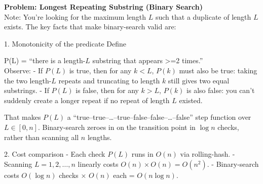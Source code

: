 \noindent\textbf{Problem: Longest Repeating Substring (Binary Search)} 
\\ 

Note: You’re looking for the maximum length \(L\) such that a duplicate of length \(L\) exists. The key facts that make binary-search valid are:

1.  Monotonicity of the predicate  
    Define  

      P(L) = “there is a length-\(L\) substring that appears >=2 times.”
    \\
    Observe:
    -  If \(P(L)\) is true, then for any \(k < L\), \(P(k)\) must also be true: taking the two length-\(L\) repeats and truncating to length \(k\) still gives two equal substrings.
    -  If \(P(L)\) is false, then for any \(k > L\), \(P(k)\) is also false: you can’t suddenly create a longer repeat if no repeat of length \(L\) existed.

    That makes \(P(L)\) a “true–true–…–true–false–false–…–false” step function over \(L\in[0,n]\). Binary-search zeroes in on the transition point in \(\log n\) checks, rather than scanning all \(n\) lengths.

2.  Cost comparison  
    -  Each check \(P(L)\) runs in \(O(n)\) via rolling-hash.  
    -  Scanning \(L=1,2,\dots,n\) linearly costs \(O(n)\times O(n)=O(n^2)\).  
    -  Binary-search costs \(O(\log n)\) checks × \(O(n)\) each = \(O(n\log n)\).



